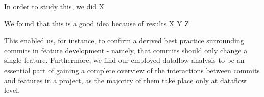 In order to study this, we did X

We found that this is a good idea because of results X Y Z

This enabled us, for instance, to confirm a derived best practice surrounding commits in feature development - namely, that commits should only change a single feature.
Furthermore, we find our employed dataflow analysis to be an essential part of gaining a complete overview of the interactions between commits and features in a project, as the majority of them take place only at dataflow level.




\fi 

\vfill

\endgroup

\vfill
